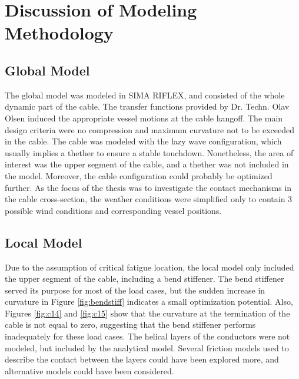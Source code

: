 \section{Discussion of Modeling Methodology}
\subsection{Global Model}
 The global model was modeled in SIMA RIFLEX, and consisted of the whole dynamic part of the cable. The transfer functions provided by Dr. Techn. Olav Olsen induced the appropriate vessel motions at the cable hangoff. The main design criteria were no compression and maximum curvature not to be exceeded in the cable.  The cable was modeled with the lazy wave configuration, which usually implies a thether to ensure a stable touchdown. Nonetheless, the area of interest was the upper segment of the cable, and a thether was not included in the model. Moreover, the cable configuration could probably be optimized further. As the focus of the thesis was to investigate the contact mechanisms in the cable cross-section, the weather conditions were simplified only to contain 3 possible wind conditions and corresponding vessel positions. 

\subsection{Local Model}
\label{sec:disclocmod}
Due to the assumption of critical fatigue location, the local model only included the upper segment of the cable, including a bend stiffener. The bend stiffener served its purpose for most of the load cases, but the sudden increase in curvature in Figure \ref{fig:bendstiff} indicates a small optimization potential. Also, Figures \ref{fig:c14} and \ref{fig:c15}  show that the curvature at the termination of the cable is not equal to zero, suggesting that the bend stiffener performs inadequately for these load cases.   The helical layers of the conductors were not modeled, but included by the analytical model. Several friction models used to describe the contact between the layers could have been explored more, and alternative models could have been considered.

